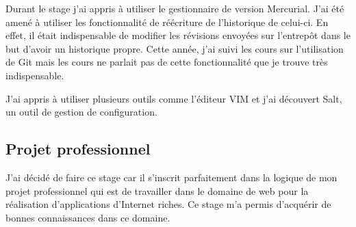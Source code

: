 Durant le stage j'ai appris à utiliser le gestionnaire de version Mercurial.
J'ai été amené à utiliser les fonctionnalité de réécriture de l'historique de
celui-ci. En effet, il était indispensable de modifier les révisions envoyées
sur l'entrepôt dans le but d'avoir un historique propre. Cette année, j'ai
suivi les cours sur l'utilisation de Git mais les cours ne parlait pas de cette
fonctionnalité que je trouve très indispensable. 

J'ai appris à utiliser plusieurs outils comme l'éditeur VIM et j'ai découvert
Salt, un outil de gestion de configuration.  \subsection{Projet professionnel}
J'ai décidé de faire ce stage car il s'inscrit parfaitement dans la logique de
mon projet professionnel qui est de travailler dans le domaine de web pour la
réalisation d'applications d'Internet riches. Ce stage m'a permis d'acquérir
de bonnes connaissances dans ce domaine.  

